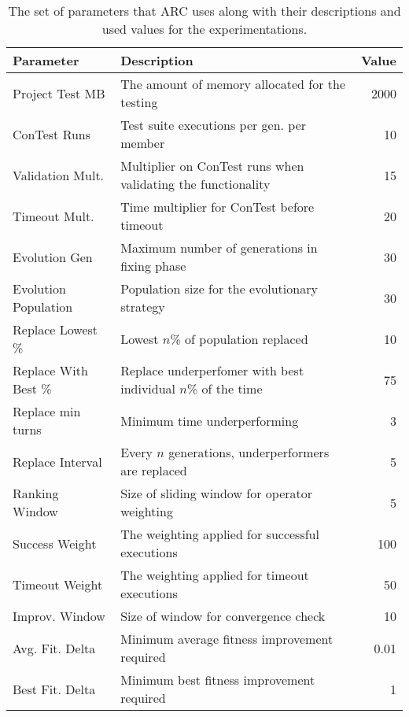 \begin{table}%
\caption{The set of parameters that ARC uses along with their descriptions and
used values for the experimentations.}
\begin{center}
\lstset{basicstyle=\scriptsize}
\begin{tabular}{|l|l|r|}
\hline
\textbf{Parameter} & \textbf{Description} & \textbf{Value}\\
\hline
Project Test MB & The amount of memory allocated for the testing & 2000\\
\hline
ConTest Runs & Test suite executions per gen. per member & 10\\
\hline
Validation Mult. & Multiplier on ConTest runs when validating the functionality & 15\\
\hline
Timeout Mult. & Time multiplier for ConTest before timeout & 20\\
\hline
Evolution Gen & Maximum number of generations in fixing phase & 30\\
\hline
Evolution Population & Population size for the evolutionary strategy & 30\\
\hline
Replace Lowest \% & Lowest $n$\% of population replaced & 10\\
\hline
Replace With Best \% & Replace underperfomer with best individual $n$\% of the time & 75\\
\hline
Replace min turns & Minimum time underperforming & 3\\
\hline
Replace Interval & Every $n$ generations, underperformers are replaced & 5\\
\hline
Ranking Window & Size of sliding window for operator weighting & 5\\
\hline
Success Weight & The weighting applied for successful executions & 100\\
\hline
Timeout Weight & The weighting applied for timeout executions & 50\\
\hline
Improv. Window & Size of window for convergence check & 10\\
\hline
Avg. Fit. Delta & Minimum average fitness improvement required & 0.01\\
\hline
Best Fit. Delta & Minimum best fitness improvement required & 1\\
\hline
\end{tabular}
\label{tbl:used_parameters}
\end{center}
\end{table}

